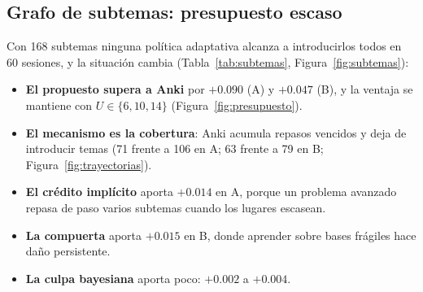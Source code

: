 \documentclass[11pt]{article}
\theoremstyle{definition}
\theoremstyle{remark}
\begin{document}
\subsection{Grafo de subtemas: presupuesto escaso}

Con 168 subtemas ninguna política adaptativa alcanza a introducirlos todos en 60 sesiones, y la situación cambia (Tabla~\ref{tab:subtemas}, Figura~\ref{fig:subtemas}):

\begin{itemize}
\item \textbf{El propuesto supera a Anki} por $+0.090$ (A) y $+0.047$ (B), y la ventaja se mantiene con $U\in\{6,10,14\}$ (Figura~\ref{fig:presupuesto}).
\item \textbf{El mecanismo es la cobertura}: Anki acumula repasos vencidos y deja de introducir temas (71 frente a 106 en A; 63 frente a 79 en B; Figura~\ref{fig:trayectorias}).
\item \textbf{El crédito implícito} aporta $+0.014$ en A, porque un problema avanzado repasa de paso varios subtemas cuando los lugares escasean.
\item \textbf{La compuerta} aporta $+0.015$ en B, donde aprender sobre bases frágiles hace daño persistente.
\item \textbf{La culpa bayesiana} aporta poco: $+0.002$ a $+0.004$.
\end{itemize}
\end{document}

